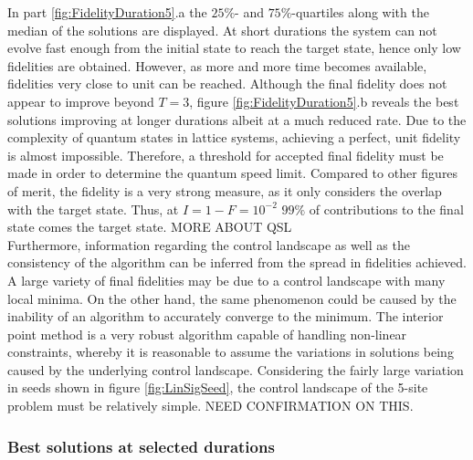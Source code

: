 In part \ref{fig:FidelityDuration5}.a the $25\%$- and $75\%$-quartiles along with the median of the solutions are displayed. At short durations the system can not evolve fast enough from the initial state to reach the target state, hence only low fidelities are obtained. However, as more and more time becomes available, fidelities very close to unit can be reached. Although the final fidelity does not appear to improve beyond $T=3$, figure \ref{fig:FidelityDuration5}.b reveals the best solutions improving at longer durations albeit at a much reduced rate. Due to the complexity of quantum states in lattice systems, achieving a perfect, unit fidelity is almost impossible. Therefore, a threshold for accepted final fidelity must be made in order to determine the quantum speed limit. Compared to other figures of merit, the fidelity is a very strong measure, as it only considers the overlap with the target state. Thus, at $I = 1-F = 10^{-2}$ $99\%$ of contributions to the final state comes the target state. MORE ABOUT QSL\\  
Furthermore, information regarding the control landscape as well as the consistency of the algorithm can be inferred from the spread in fidelities achieved. A large variety of final fidelities may be due to a control landscape with many local minima. On the other hand, the same phenomenon could be caused by the inability of an algorithm to accurately converge to the minimum. The interior point method is a very robust algorithm capable of handling non-linear constraints, whereby it is reasonable to assume the variations in solutions being caused by the underlying control landscape. Considering the fairly large variation in seeds shown in figure \ref{fig:LinSigSeed}, the control landscape of the 5-site problem must be relatively simple. NEED CONFIRMATION ON THIS.

\subsubsection{Best solutions at selected durations} 
